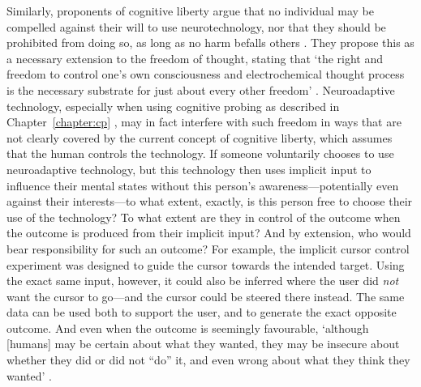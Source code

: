 Similarly, proponents of cognitive liberty argue that no individual may be compelled against their will to use neurotechnology, nor that they should be prohibited from doing so, as long as no harm befalls others \cite{boire2000cognitiveliberty}. They propose this as a necessary extension to the freedom of thought, stating that `the right and freedom to control one's own consciousness and electrochemical thought process is the necessary substrate for just about every other freedom' \cite{sententia2004cognitiveliberty}. Neuroadaptive technology, especially when using cognitive probing as described in Chapter~\ref{chapter:cp} \cite{krol2020cognitiveprobing}, may in fact interfere with such freedom in ways that are not clearly covered by the current concept of cognitive liberty, which assumes that the human controls the technology. If someone voluntarily chooses to use neuroadaptive technology, but this technology then uses implicit input to influence their mental states without this person's awareness---potentially even against their interests---to what extent, exactly, is this person free to choose their use of the technology? To what extent are they in control of the outcome when the outcome is produced from their implicit input? And by extension, who would bear responsibility for such an outcome? For example, the implicit cursor control experiment was designed to guide the cursor towards the intended target. Using the exact same input, however, it could also be inferred where the user did \emph{not} want the cursor to go---and the cursor could be steered there instead. The same data can be used both to support the user, and to generate the exact opposite outcome.
And even when the outcome is seemingly favourable, `although [humans] may be certain about what they wanted, they may be insecure about whether they did or did not ``do'' it, and even wrong about what they think they wanted' \cite{haselager2013agency}. 


